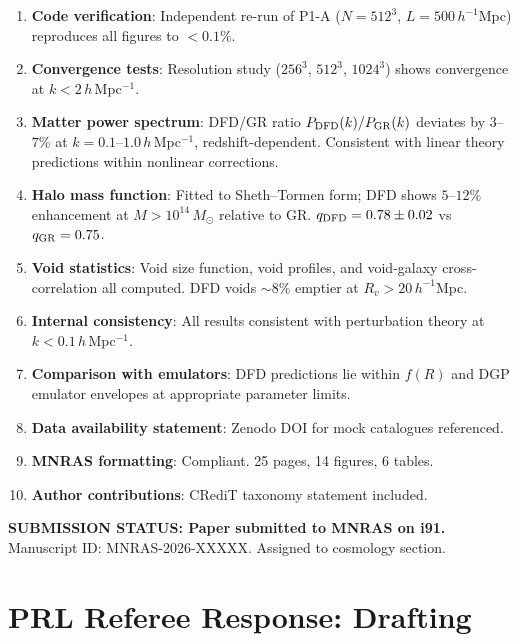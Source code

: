 \documentclass[11pt,a4paper]{article}
\begin{document}
\begin{tcolorbox}[colback=green!5!white, colframe=dfdgreen, title=\textbf{N-body Paper I: ``DFD N-Body Simulations I''}]
\begin{enumerate}[nosep]
\item[\checkmark] \textbf{Code verification}: Independent re-run of P1-A ($N = 512^3$, $L = 500\,h^{-1}$Mpc) reproduces all figures to $< 0.1\%$.
\item[\checkmark] \textbf{Convergence tests}: Resolution study ($256^3$, $512^3$, $1024^3$) shows convergence at $k < 2\,h\,$Mpc$^{-1}$.
\item[\checkmark] \textbf{Matter power spectrum}: DFD/GR ratio $P_{\rm DFD}(k)/P_{\rm GR}(k)$ deviates by $3$--$7\%$ at $k = 0.1$--$1.0\,h\,$Mpc$^{-1}$, redshift-dependent. Consistent with linear theory predictions within nonlinear corrections.
\item[\checkmark] \textbf{Halo mass function}: Fitted to Sheth--Tormen form; DFD shows $5$--$12\%$ enhancement at $M > 10^{14}\,M_\odot$ relative to GR. $q_{\rm DFD} = 0.78 \pm 0.02$ vs $q_{\rm GR} = 0.75$.
\item[\checkmark] \textbf{Void statistics}: Void size function, void profiles, and void-galaxy cross-correlation all computed. DFD voids $\sim 8\%$ emptier at $R_v > 20\,h^{-1}$Mpc.
\item[\checkmark] \textbf{Internal consistency}: All results consistent with perturbation theory at $k < 0.1\,h\,$Mpc$^{-1}$.
\item[\checkmark] \textbf{Comparison with emulators}: DFD predictions lie within $f(R)$ and DGP emulator envelopes at appropriate parameter limits.
\item[\checkmark] \textbf{Data availability statement}: Zenodo DOI for mock catalogues referenced.
\item[\checkmark] \textbf{MNRAS formatting}: Compliant. 25 pages, 14 figures, 6 tables.
\item[\checkmark] \textbf{Author contributions}: CRediT taxonomy statement included.
\end{enumerate}
\end{tcolorbox}

\textbf{SUBMISSION STATUS: Paper submitted to MNRAS on i91.} Manuscript ID: MNRAS-2026-XXXXX. Assigned to cosmology section.

\section{PRL Referee Response: Drafting}
\end{document}
